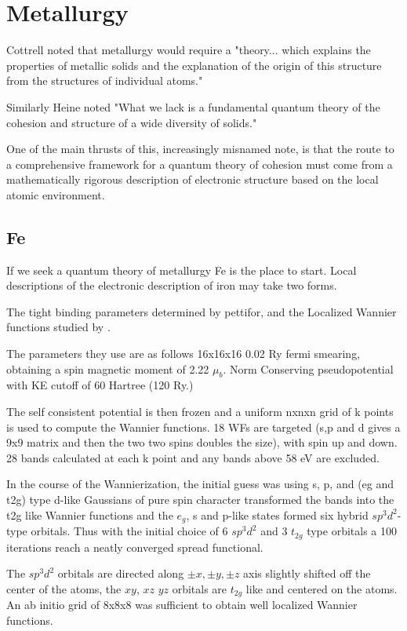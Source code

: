 \chapter{Metallurgy}
  Cottrell noted that metallurgy would require a "theory... which explains
the properties of metallic solids and the explanation of the origin of this
structure from the structures of individual atoms." 

Similarly Heine noted "What we lack is a fundamental quantum 
theory of the cohesion and structure of a wide diversity of solids." 

One of the main thrusts of this, increasingly misnamed note, is that the route
to a comprehensive framework for a quantum theory of cohesion must come
from a mathematically rigorous description of electronic structure based
on the local atomic environment. 

\section{Fe}
If we seek a quantum theory of metallurgy Fe is the place to start.
Local descriptions of the electronic description of iron may take two forms. 

The tight binding parameters determined by pettifor, and the Localized 
Wannier functions studied by \cite{yates06}. 

The parameters they use are as follows 16x16x16 0.02 Ry fermi smearing, obtaining
a spin magnetic moment of 2.22 $\mu_{b}$. Norm Conserving pseudopotential with KE cutoff
of 60 Hartree (120 Ry.)

The self consistent potential is then frozen and a uniform nxnxn grid of k points is
used to compute the Wannier functions. 18 WFs are targeted (s,p and d gives a 9x9 matrix
and then the two two spins doubles the size), with spin up and 
down. 28 bands calculated at each k point and any bands above 58 eV are excluded.

In the course of the Wannierization, the initial guess was using s, p, and (eg and t2g)
type d-like Gaussians of pure spin character transformed the bands into the t2g like 
Wannier functions and the $e_{g}$, s and p-like states formed six hybrid 
$sp^{3}d^{2}$-type orbitals. Thus with the initial choice of 6 $sp^{3}d^{2}$ and 3 
$t_{2g}$  type orbitals a 100 iterations reach a neatly converged spread functional.

The $sp^{3}d^{2}$ orbitals are directed along $\pm x, \pm y, \pm z$ axis 
slightly shifted off the center of the atoms, the $xy$, $xz$ $yz$ orbitals are
$t_{2g}$ like and centered on the atoms. An ab initio grid of 8x8x8 was sufficient
to obtain well localized Wannier functions.

